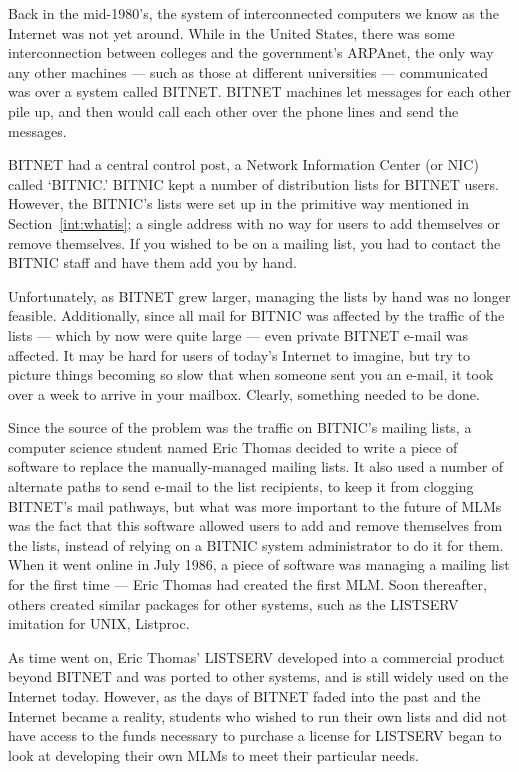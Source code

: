 \documentclass{book}
\begin{document}
Back in the mid-1980's, the system of interconnected computers we know as the
Internet was not yet around.  While in the United States, there was some
interconnection between colleges and the government's ARPAnet, the only way
any other machines --- such as those at different universities ---
communicated was over a system called BITNET.  BITNET machines
let messages for each other pile up, and then would call each other over the
phone lines and send the messages.

BITNET had a central control post, a Network Information Center (or NIC)
called `BITNIC.'  BITNIC kept a number of distribution lists for BITNET users.
However, the BITNIC's lists were set up in the primitive way mentioned in
Section~\ref{int:whatis}; a single address with no way for users to add
themselves or remove themselves.  If you wished to be on a mailing list, you
had to contact the BITNIC staff and have them add you by hand.

Unfortunately, as BITNET grew larger, managing the lists by hand was no longer
feasible.  Additionally, since all mail for BITNIC was affected by the traffic
of the lists --- which by now were quite large --- even private BITNET e-mail
was affected.  It may be hard for users of today's Internet to imagine, but
try to picture things becoming so slow that when someone sent you an e-mail,
it took over a week to arrive in your mailbox.  Clearly, something needed to
be done.
   
Since the source of the problem was the traffic on BITNIC's mailing lists, a
computer science student named Eric Thomas decided to write a piece of
software to replace the manually-managed mailing lists.  It also used a number
of alternate paths to send e-mail to the list recipients, to keep it from
clogging BITNET's mail pathways, but what was more important to the future of
MLMs was the fact that this software allowed users to add and remove
themselves from the lists, instead of relying on a BITNIC system administrator
to do it for them.  When it went online in July 1986, a piece of software was
managing a mailing list for the first time --- Eric Thomas had created the first
MLM.  Soon thereafter, others created similar packages for other systems, such
as the LISTSERV imitation for UNIX, Listproc.
   
As time went on, Eric Thomas' LISTSERV developed into a commercial product
beyond BITNET and was ported to other systems, and is still widely used on the
Internet today.  However, as the days of BITNET faded into the past and the
Internet became a reality, students who wished to run their own lists and did
not have access to the funds necessary to purchase a license for LISTSERV
began to look at developing their own MLMs to meet their particular needs.
   
\end{document}
